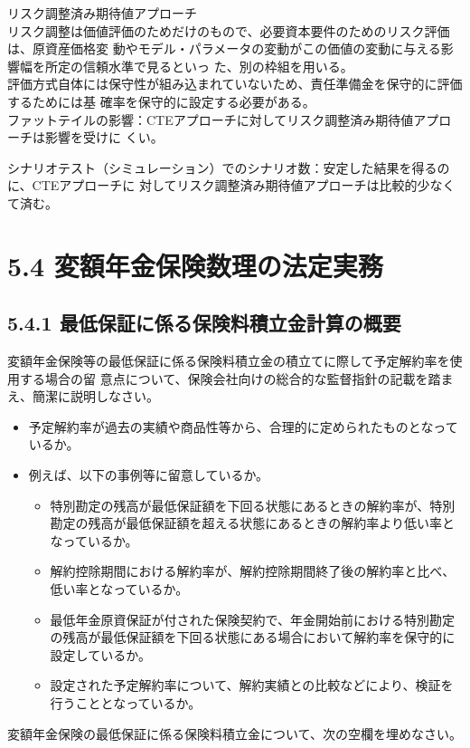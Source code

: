 \documentclass[report,gutter=10mm,fore-edge=10mm,uplatex,dvipdfmx]{jlreq}
\begin{document}
リスク調整済み期待値アプローチ\\
リスク調整は価値評価のためだけのもので、必要資本要件のためのリスク評価は、原資産価格変
動やモデル・パラメータの変動がこの価値の変動に与える影響幅を所定の信頼水準で見るといっ
た、別の枠組を用いる。\\
評価方式自体には保守性が組み込まれていないため、責任準備金を保守的に評価するためには基
確率を保守的に設定する必要がある。\\

ファットテイルの影響：CTEアプローチに対してリスク調整済み期待値アプローチは影響を受けに
くい。

シナリオテスト（シミュレーション）でのシナリオ数：安定した結果を得るのに、CTEアプローチに
対してリスク調整済み期待値アプローチは比較的少なくて済む。
\section{5.4 変額年金保険数理の法定実務}
\subsection{5.4.1 最低保証に係る保険料積立金計算の概要}
変額年金保険等の最低保証に係る保険料積立金の積立てに際して予定解約率を使用する場合の留
意点について、保険会社向けの総合的な監督指針の記載を踏まえ、簡潔に説明しなさい。
\answer{}
\begin{itemize}
\item[]  予定解約率が過去の実績や商品性等から、合理的に定められたものとなっているか。
\item[]  例えば、以下の事例等に留意しているか。
\begin{itemize}
\item[]  特別勘定の残高が最低保証額を下回る状態にあるときの解約率が、特別勘定の残高が最低保証額を超える状態にあるときの解約率より低い率となっているか。
\item[]  解約控除期間における解約率が、解約控除期間終了後の解約率と比べ、低い率となっているか。
\item[]  最低年金原資保証が付された保険契約で、年金開始前における特別勘定の残高が最低保証額を下回る状態にある場合において解約率を保守的に設定しているか。
\item[]  設定された予定解約率について、解約実績との比較などにより、検証を行うこととなっているか。
\end{itemize}
\end{itemize}

変額年金保険の最低保証に係る保険料積立金について、次の空欄を埋めなさい。
\end{document}
